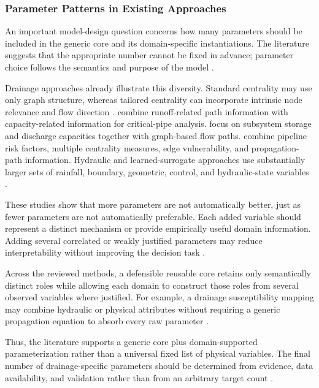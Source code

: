 \subsubsection{Parameter Patterns in Existing
Approaches}\label{parameter-patterns-in-existing-approaches}

An important model-design question concerns how many parameters should
be included in the generic core and its domain-specific instantiations.
The literature suggests that the
appropriate number cannot be fixed in advance; parameter choice follows
the semantics and purpose of the model \citep{simone2022,dastgir2023,
meijer2023,zhang2024,zhang2025}.

Drainage approaches already illustrate this diversity. Standard
centrality may use only graph structure, whereas tailored centrality can
incorporate intrinsic node relevance and flow direction
\citep{simone2022,simone2023}. \citet{dastgir2023} combine runoff-related path
information with capacity-related information for critical-pipe
analysis. \citet{meijer2023} focus on subsystem storage and
discharge capacities together with graph-based flow paths. \citet{zhang2025}
combine pipeline risk factors, multiple centrality measures,
edge vulnerability, and propagation-path information. Hydraulic and
learned-surrogate approaches use substantially larger sets of rainfall,
boundary, geometric, control, and hydraulic-state variables \citep{zhang2024}.

These studies show that more parameters are not automatically better,
just as fewer parameters are not automatically preferable. Each added
variable should represent a distinct mechanism or provide empirically
useful domain information. Adding several correlated or weakly justified
parameters may reduce interpretability without improving the decision
task \citep{simone2022,dastgir2023,meijer2023,zhang2024}.

Across the reviewed methods, a defensible reusable core retains only
semantically distinct roles while allowing each domain to construct those
roles from several observed variables where justified. For example, a
drainage susceptibility mapping may combine hydraulic or physical
attributes without requiring a generic propagation equation to absorb
every raw parameter \citep{dastgir2023,meijer2023,zhang2025}.

Thus, the literature supports a generic core plus domain-supported
parameterization rather than a universal fixed list of physical
variables. The final number of drainage-specific parameters should be
determined from evidence, data availability, and validation rather than
from an arbitrary target count \citep{simone2022,dastgir2023,zhang2024}.


